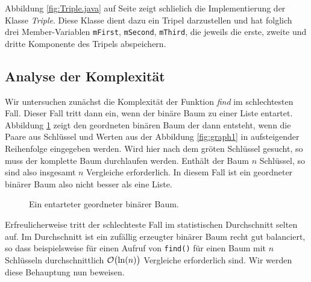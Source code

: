 \noindent
Abbildung \ref{fig:Triple.java} auf Seite \pageref{fig:Triple.java} zeigt schlie\3lich die
Implementierung der Klasse \textsl{Triple}.  Diese Klasse dient dazu ein Tripel
darzustellen und hat folglich drei Member-Variablen \texttt{mFirst}, \texttt{mSecond},
\texttt{mThird}, die jeweils die erste, zweite und dritte Komponente des Tripels abspeichern.
\pagebreak



\subsection{Analyse der Komplexit\"at}
Wir untersuchen zun\"achst die Komplexit\"at der Funktion \textsl{find} im schlechtesten Fall.
Dieser Fall tritt dann ein, wenn der bin\"are Baum zu einer Liste entartet.  Abbildung
\ref{fig:degenerated} zeigt den geordneten bin\"aren Baum der dann entsteht, wenn die Paare
aus Schl\"ussel und Werten aus der Abbildung
\ref{fig:graph1} in aufsteigender Reihenfolge eingegeben werden.  Wird hier nach dem
gr\"o\3ten Schl\"ussel gesucht, so muss der komplette Baum durchlaufen werden.  Enth\"alt der Baum
$n$ Schl\"ussel, so sind also insgesamt $n$ Vergleiche erforderlich.  In diesem Fall ist ein
geordneter bin\"arer Baum also nicht besser als eine Liste.

\begin{figure}[!th]
  \centering
  \caption{Ein entarteter  geordneter bin\"arer Baum.}
  \label{fig:degenerated}
\end{figure}

Erfreulicherweise tritt der schlechteste Fall im statistischen Durchschnitt selten auf.
Im Durchschnitt ist ein zuf\"allig erzeugter bin\"arer Baum recht gut balanciert, so dass 
beispielsweise f\"ur einen Aufruf von \texttt{find()} f\"ur einen Baum mit $n$ Schl\"usseln
durchschnittlich  $\mathcal{O}\bigl(\ln(n)\bigr)$
Vergleiche erforderlich sind. Wir werden diese Behauptung nun beweisen.



